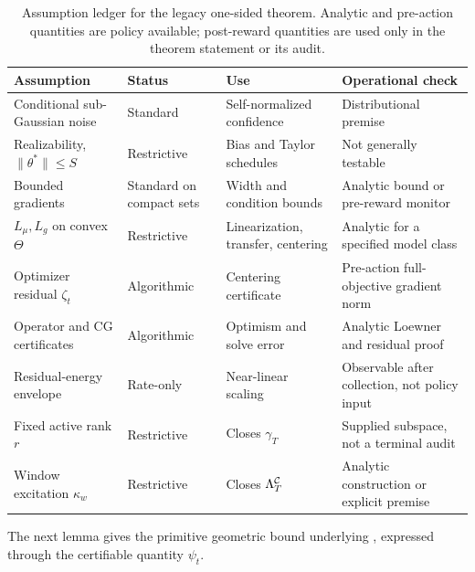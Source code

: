 \begin{table}[h]
\centering\ccetablesize
\begin{tabular}{p{}p{}p{}p{}}
\toprule
Assumption & Status & Use & Operational check\\
\midrule
Conditional sub-Gaussian noise & Standard & Self-normalized confidence & Distributional premise\\
Realizability, $\|\theta^*\|\le S$ & Restrictive & Bias and Taylor schedules & Not generally testable\\
Bounded gradients & Standard on compact sets & Width and condition bounds & Analytic bound or pre-reward monitor\\
$L_\mu,L_g$ on convex $\Theta$ & Restrictive & Linearization, transfer, centering & Analytic for a specified model class\\
Optimizer residual $\zeta_t$ & Algorithmic & Centering certificate & Pre-action full-objective gradient norm\\
Operator and CG certificates & Algorithmic & Optimism and solve error & Analytic Loewner and residual proof\\
Residual-energy envelope & Rate-only & Near-linear scaling & Observable after collection, not policy input\\
Fixed active rank $r$ & Restrictive & Closes $\gamma_T$ & Supplied subspace, not a terminal audit\\
Window excitation $\kappa_w$ & Restrictive & Closes $\Lambda^{\mathcal{C}}_T$ & Analytic construction or explicit premise\\
\bottomrule
\end{tabular}
\caption{Assumption ledger for the legacy one-sided theorem.  Analytic and
pre-action quantities are policy available; post-reward quantities are used
only in the theorem statement or its audit.}
\label{tab:assumptions}
\end{table}

The next lemma gives the primitive geometric bound underlying
, expressed through the certifiable quantity $\psi_t$.

